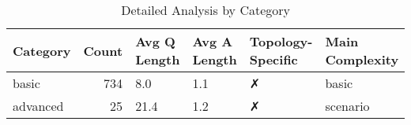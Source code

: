 \begin{table}
\caption{Detailed Analysis by Category}
\label{tab:category_analysis}
\begin{tabular}{lrllll}
\toprule
Category & Count & Avg Q Length & Avg A Length & Topology-Specific & Main Complexity \\
\midrule
basic & 734 & 8.0 & 1.1 & ✗ & basic \\
advanced & 25 & 21.4 & 1.2 & ✗ & scenario \\
\bottomrule
\end{tabular}
\end{table}
